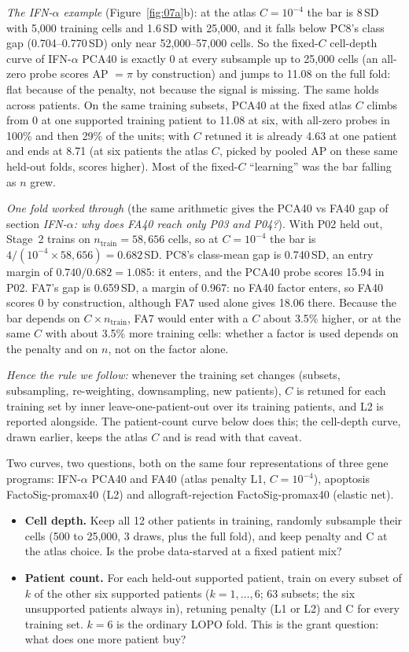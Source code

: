 \emph{The IFN-$\alpha$ example} (Figure~\ref{fig:07a}b): at the atlas $C = 10^{-4}$ the bar is 8\,SD with 5,000 training cells and 1.6\,SD with 25,000, and it falls below PC8's class gap (0.704--0.770\,SD) only near 52,000--57,000 cells. So the fixed-$C$ cell-depth curve of IFN-$\alpha$ PCA40 is exactly 0 at every subsample up to 25,000 cells (an all-zero probe scores AP $= \pi$ by construction) and jumps to 11.08\pp{} on the full fold: flat because of the penalty, not because the signal is missing. The same holds across patients. On the same training subsets, PCA40 at the fixed atlas $C$ climbs from 0 at one supported training patient to 11.08\pp{} at six, with all-zero probes in 100\% and then 29\% of the units; with $C$ retuned it is already 4.63\pp{} at one patient and ends at 8.71\pp{} (at six patients the atlas $C$, picked by pooled AP on these same held-out folds, scores higher). Most of the fixed-$C$ ``learning'' was the bar falling as $n$ grew.

\emph{One fold worked through} (the same arithmetic gives the PCA40 vs FA40 gap of section \emph{IFN-$\alpha$: why does FA40 reach only P03 and P04?}). With P02 held out, Stage~2 trains on $n_{\text{train}} = 58{,}656$ cells, so at $C = 10^{-4}$ the bar is $4/(10^{-4} \times 58{,}656) = 0.682$\,SD. PC8's class-mean gap is 0.740\,SD, an entry margin of $0.740/0.682 = 1.085$: it enters, and the PCA40 probe scores 15.94\pp{} in P02. FA7's gap is 0.659\,SD, a margin of 0.967: no FA40 factor enters, so FA40 scores 0 by construction, although FA7 used alone gives 18.06\pp{} there. Because the bar depends on $C \times n_{\text{train}}$, FA7 would enter with a $C$ about 3.5\% higher, or at the same $C$ with about 3.5\% more training cells: whether a factor is used depends on the penalty and on $n$, not on the factor alone.

\emph{Hence the rule we follow:} whenever the training set changes (subsets, subsampling, re-weighting, downsampling, new patients), $C$ is retuned for each training set by inner leave-one-patient-out over its training patients, and L2 is reported alongside. The patient-count curve below does this; the cell-depth curve, drawn earlier, keeps the atlas $C$ and is read with that caveat.

Two curves, two questions, both on the same four representations of three gene programs: IFN-$\alpha$ PCA40 and FA40 (atlas penalty L1, $C = 10^{-4}$), apoptosis FactoSig-promax40 (L2) and allograft-rejection FactoSig-promax40 (elastic net).
\begin{itemize}
\item \textbf{Cell depth.} Keep all 12 other patients in training, randomly subsample their cells (500 to 25,000, 3 draws, plus the full fold), and keep penalty and C at the atlas choice. Is the probe data-starved at a fixed patient mix?
\item \textbf{Patient count.} For each held-out supported patient, train on every subset of $k$ of the other six supported patients ($k = 1,\dots,6$; 63 subsets; the six unsupported patients always in), retuning penalty (L1 or L2) and C for every training set. $k = 6$ is the ordinary LOPO fold. This is the grant question: what does one more patient buy?
\end{itemize}

